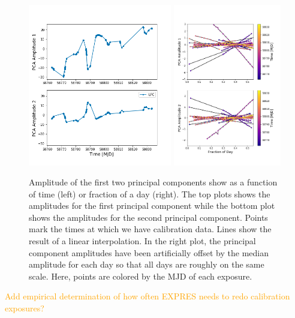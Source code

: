 \documentclass[modern]{aastex63}
\newcommand{\lz}[1]{\textcolor{orange}{#1}}
\begin{document}
\begin{figure}[h!]
\centering
\includegraphics[width=0.56\textwidth]{Figures/pcA_lfc.png}
\includegraphics[width=0.42\textwidth]{Figures/pcAs_byDay.png}
\caption{Amplitude of the first two principal components show as a function of time (left) or fraction of a day (right).  The top plots shows the amplitudes for the first principal component while the bottom plot shows the amplitudes for the second principal component.  Points mark the times at which we have calibration data.  Lines show the result of a linear interpolation.  In the right plot, the principal component amplitudes have been artificially offset by the median amplitude for each day so that all days are roughly on the same scale.  Here, points are colored by the MJD of each exposure.}
\label{fig:nightlyVariation}
\end{figure} 

\lz{Add empirical determination of how often EXPRES needs to redo calibration exposures?}
\end{document}
